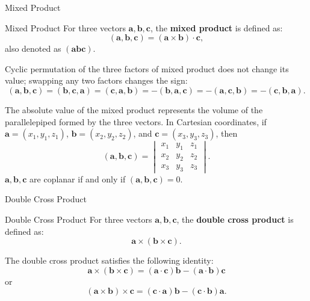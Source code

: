 \documentclass[11pt]{../../TexTemplate/elegantbook} %
\begin{document}
\begin{leftbarTitle}{Mixed Product}\end{leftbarTitle} %
\begin{definition}{Mixed Product}
    For three vectors \(\mathbf{a}, \mathbf{b}, \mathbf{c}\), the \textbf{mixed product} is defined as:
    \[
    (\mathbf{a}, \mathbf{b}, \mathbf{c}) = (\mathbf{a} \times \mathbf{b}) \cdot \mathbf{c},
    \]
    also denoted as \((\mathbf{a}\mathbf{b}\mathbf{c})\).
\end{definition}

\begin{property}
    Cyclic permutation of the three factors of mixed product does not change its value; 
    swapping any two factors changes the sign:
    \[
    (\mathbf{a}, \mathbf{b}, \mathbf{c}) = (\mathbf{b}, \mathbf{c}, \mathbf{a}) 
    = (\mathbf{c}, \mathbf{a}, \mathbf{b}) = -(\mathbf{b}, \mathbf{a}, \mathbf{c}) 
    = -(\mathbf{a}, \mathbf{c}, \mathbf{b}) = -(\mathbf{c}, \mathbf{b}, \mathbf{a}).
    \]
\end{property}

The absolute value of the mixed product represents the volume of the parallelepiped formed by the three vectors.
In Cartesian coordinates, if \(\mathbf{a} = (x_{1}, y_{1}, z_{1})\), \(\mathbf{b} = (x_{2}, y_{2}, z_{2})\),
and \(\mathbf{c} = (x_{3}, y_{3}, z_{3})\), then
\[
(\mathbf{a}, \mathbf{b}, \mathbf{c}) =
\begin{vmatrix}
    x_{1} & y_{1} & z_{1} \\
    x_{2} & y_{2} & z_{2} \\
    x_{3} & y_{3} & z_{3}
\end{vmatrix}.
\]
\(\mathbf{a}, \mathbf{b}, \mathbf{c}\) are coplanar if and only if \((\mathbf{a}, \mathbf{b}, \mathbf{c}) = 0\).



\begin{leftbarTitle}{Double Cross Product}\end{leftbarTitle} %
\begin{definition}{Double Cross Product}
    For three vectors \(\mathbf{a}, \mathbf{b}, \mathbf{c}\), the \textbf{double cross product} is defined as:
    \[
    \mathbf{a} \times (\mathbf{b} \times \mathbf{c}).
    \]
\end{definition}
\begin{property}
    The double cross product satisfies the following identity:
    \[
    \mathbf{a} \times (\mathbf{b} \times \mathbf{c}) = (\mathbf{a} \cdot \mathbf{c})\mathbf{b} - (\mathbf{a} \cdot \mathbf{b})\mathbf{c}
    \]
    or
    \[
    (\mathbf{a} \times \mathbf{b}) \times \mathbf{c} = (\mathbf{c} \cdot \mathbf{a})\mathbf{b} - (\mathbf{c} \cdot \mathbf{b})\mathbf{a}.
    \]
\end{property}
\end{document}
